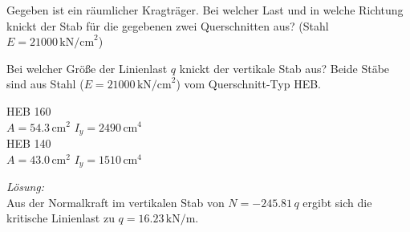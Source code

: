 \begin{example}
	Gegeben ist ein räumlicher Kragträger.
	Bei welcher Last und in welche Richtung knickt der Stab für die gegebenen zwei Querschnitten aus? (Stahl $E=21000\,\text{kN/cm}^2$)
	\begin{center}
		
	\end{center}
\end{example}

\begin{example}
	Bei welcher Größe der Linienlast $q$ knickt der vertikale Stab aus? Beide Stäbe sind aus Stahl ($E=21000\,\text{kN/cm}^2$) vom Querschnitt-Typ HEB\footnotemark.
	\begin{center}
		\hspace{5mm}
		\begin{minipage}[c]{5cm}
			\vspace*{-5.5cm}
				HEB 160 \\
				$A=54.3\,\text{cm}^2$ \hspace{1mm}  $I_y=2490\,\text{cm}^4$\\[5mm]
				HEB 140 \\
				$A=43.0\,\text{cm}^2$ \hspace{1mm}  $I_y=1510\,\text{cm}^4$
		\end{minipage}
	\end{center}
	\textit{Lösung:}\\
	Aus der Normalkraft im vertikalen Stab von $N=-245.81\,q$ ergibt sich die kritische Linienlast zu $q=16.23\,\text{kN/m}$.
\end{example}
